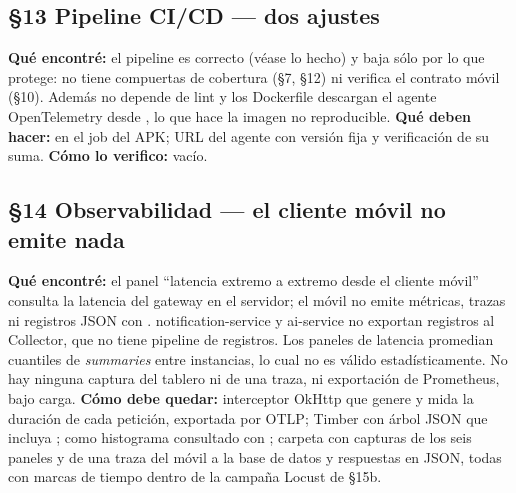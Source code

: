 \subsection*{\S13 Pipeline CI/CD --- dos ajustes}
\textbf{Qu\'e encontr\'e:} el pipeline es correcto (v\'ease lo hecho) y baja s\'olo por lo que protege: no tiene compuertas de cobertura (\S7, \S12) ni verifica el contrato m\'ovil (\S10). Adem\'as  no depende de lint y los Dockerfile descargan el agente OpenTelemetry desde , lo que hace la imagen no reproducible. \textbf{Qu\'e deben hacer:}  en el job del APK; URL del agente con versi\'on fija y verificaci\'on de su suma. \textbf{C\'omo lo verifico:}  vac\'io.

\subsection*{\S14 Observabilidad --- el cliente m\'ovil no emite nada}
\textbf{Qu\'e encontr\'e:} el panel ``latencia extremo a extremo desde el cliente m\'ovil'' consulta la latencia del gateway en el servidor; el m\'ovil no emite m\'etricas, trazas ni registros JSON con . notification-service y ai-service no exportan registros al Collector, que no tiene pipeline de registros. Los paneles de latencia promedian cuantiles de \emph{summaries} entre instancias, lo cual no es v\'alido estad\'isticamente. No hay ninguna captura del tablero ni de una traza, ni exportaci\'on de Prometheus, bajo carga. \textbf{C\'omo debe quedar:} interceptor OkHttp que genere  y mida la duraci\'on de cada petici\'on, exportada por OTLP; Timber con \'arbol JSON que incluya ;  como histograma consultado con ; carpeta  con capturas de los seis paneles y de una traza del m\'ovil a la base de datos y respuestas  en JSON, todas con marcas de tiempo dentro de la campa\~na Locust de \S15b.

